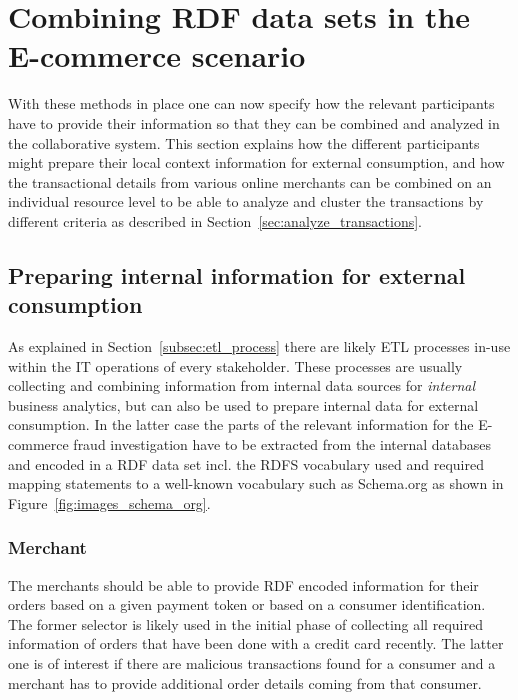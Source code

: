 
\section{Combining \gls{RDF} data sets in the \gls{E-commerce} scenario}
\label{sec:working_semantic_data}

With these methods in place one can now specify how the relevant participants have to provide their information so that they can be combined and analyzed in the collaborative system. This section explains how the different participants might prepare their local context information for external consumption, and how the transactional details from various online merchants can be combined on an individual resource level to be able to analyze and cluster the transactions by different criteria as described in Section~\ref{sec:analyze_transactions}.

\subsection{Preparing internal information for external consumption}
\label{subsec:prepare_information}

As explained in Section~\ref{subsec:etl_process} there are likely \gls{ETL} processes in-use within the \gls{IT} operations of every stakeholder. These processes are usually collecting and combining information from internal data sources for \emph{internal} business analytics, but can also be used to prepare internal data for external consumption. In the latter case the parts of the relevant information for the \gls{E-commerce} fraud investigation have to be extracted from the internal databases and encoded in a \gls{RDF} data set incl. the \gls{RDFS} vocabulary used and required mapping statements to a well-known vocabulary such as Schema.org as shown in Figure~\ref{fig:images_schema_org}.

\subsubsection{Merchant}
\label{subsub:prep_info_merchant}

The merchants should be able to provide \gls{RDF} encoded information for their orders based on a given payment token or based on a consumer identification. The former selector is likely used in the initial phase of collecting all required information of orders that have been done with a credit card recently. The latter one is of interest if there are malicious transactions found for a consumer and a merchant has to provide additional order details coming from that consumer. \\

